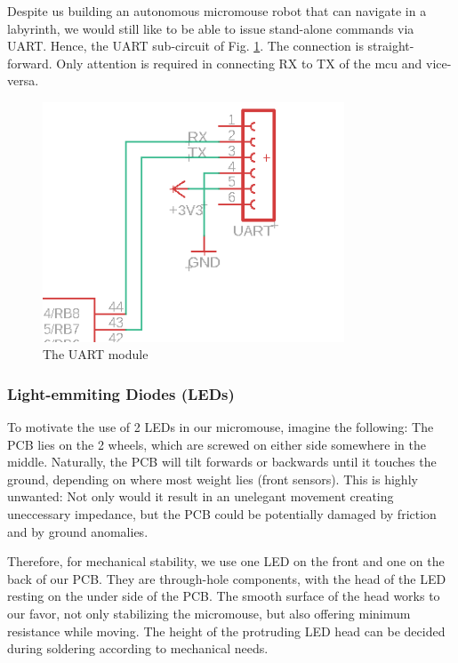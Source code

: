 Despite us building an autonomous micromouse robot that can navigate in a labyrinth, we would still like to be able to issue stand-alone commands via UART. Hence, the UART sub-circuit of Fig. \ref{fig:uart}. The connection is straight-forward. Only attention is required in connecting RX to TX of the mcu and vice-versa.

\begin{figure}[htb]
    \centering
    \includegraphics[width=0.8\textwidth]{figures/hardware/UART.PNG}
    \caption{The UART module}
    \label{fig:uart}
\end{figure}

\FloatBarrier
\vspace{1cm}


\subsubsection{Light-emmiting Diodes (LEDs)}

To motivate the use of 2 LEDs in our micromouse, imagine the following: The PCB lies on the 2 wheels, which are screwed on either side somewhere in the middle. Naturally, the PCB will tilt forwards or backwards until it touches the ground, depending on where most weight lies (front sensors). This is highly unwanted: Not only would it result in an unelegant movement creating uneccessary impedance, but the PCB could be potentially damaged by friction and by ground anomalies.

Therefore, for mechanical stability, we use one LED on the front and one on the back of our PCB. They are through-hole components, with the head of the LED resting on the under side of the PCB. The smooth surface of the head works to our favor, not only stabilizing the micromouse, but also offering minimum resistance while moving. The height of the protruding LED head can be decided during soldering according to mechanical needs.

